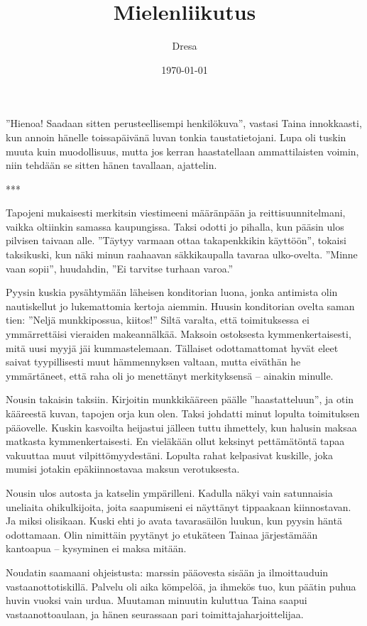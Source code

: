 ﻿\documentclass[a4paper, 12pt, finnish]{article}
\title{Mielenliikutus}
\author{Dresa}
\date{\today}
\newcommand{\q}[1]{''#1''}  %
\begin{document}
\maketitle 

\q{Hienoa! Saadaan sitten perusteellisempi henkilökuva}, vastasi Taina
innokkaasti, kun annoin hänelle toissapäivänä luvan tonkia
taustatietojani. Lupa oli tuskin muuta kuin muodollisuus,
mutta jos kerran haastatellaan ammattilaisten voimin,
niin tehdään se sitten hänen tavallaan, ajattelin. 

***

Tapojeni mukaisesti merkitsin viestimeeni määränpään ja
reittisuunnitelmani, vaikka oltiinkin samassa kaupungissa.
Taksi odotti jo pihalla, kun pääsin ulos pilvisen taivaan alle.
\q{Täytyy varmaan ottaa takapenkkikin käyttöön}, tokaisi taksikuski,
kun näki minun raahaavan säkkikaupalla tavaraa ulko-ovelta.
\q{Minne vaan sopii}, huudahdin, \q{Ei tarvitse turhaan varoa.}

Pyysin kuskia pysähtymään läheisen konditorian luona,
jonka antimista olin nautiskellut jo lukemattomia kertoja aiemmin.
Huusin konditorian ovelta saman tien: \q{Neljä munkkipossua, kiitos!}
Siltä varalta, että toimituksessa ei ymmärrettäisi vieraiden makeannälkää.
Maksoin ostoksesta kymmenkertaisesti, mitä uusi myyjä jäi kummastelemaan.
Tällaiset odottamattomat hyvät eleet saivat tyypillisesti
muut hämmennyksen valtaan, mutta eiväthän he ymmärtäneet,
että raha oli jo menettänyt merkityksensä -- ainakin minulle.

Nousin takaisin taksiin. Kirjoitin munkkikääreen päälle \q{haastatteluun},
ja otin kääreestä kuvan, tapojen orja kun olen.
Taksi johdatti minut lopulta toimituksen pääovelle. Kuskin kasvoilta
heijastui jälleen tuttu ihmettely, kun halusin maksaa matkasta
kymmenkertaisesti. En vieläkään ollut keksinyt pettämätöntä tapaa
vakuuttaa muut vilpittömyydestäni. Lopulta rahat kelpasivat kuskille,
joka mumisi jotakin epäkiinnostavaa maksun verotuksesta.
 
Nousin ulos autosta ja katselin ympärilleni. Kadulla näkyi vain
satunnaisia uneliaita ohikulkijoita, joita saapumiseni ei näyttänyt
tippaakaan kiinnostavan. Ja miksi olisikaan. Kuski ehti jo avata
tavarasäilön luukun, kun pyysin häntä odottamaan. Olin nimittäin
pyytänyt jo etukäteen Tainaa järjestämään kantoapua -- kysyminen ei
maksa mitään.

Noudatin saamaani ohjeistusta: marssin pääovesta sisään ja
ilmoittauduin vastaanottotiskillä. Palvelu oli aika kömpelöä,
ja ihmekös tuo, kun päätin puhua huvin vuoksi
vain urdua. Muutaman minuutin kuluttua Taina saapui vastaanottoaulaan,
ja hänen seurassaan pari toimittajaharjoittelijaa.
\end{document}
